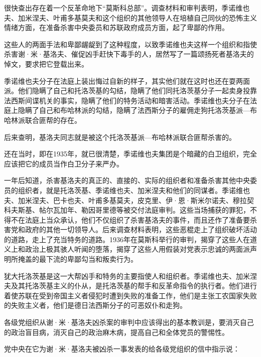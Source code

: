 很快查出存在着一个反革命地下“莫斯科总部”。调查材料和审判表明，季诺维也夫、加米涅夫、叶甫多基莫夫和这个组织的其他领导人在培植自己同伙的恐怖主义情绪方面，在准备杀害中央委员和苏联政府成员方面，起了卑鄙的作用。

这些人的两面手法和卑鄙龌龊到了这种程度，以致季诺维也夫这样一个组织和指使杀害谢·米·基洛夫、催促凶手赶快下毒手的人，居然写了一篇颂扬死者基洛夫的悼文，要求把它登载出来。

季诺维也夫分子在法庭上装出悔过自新的样子，其实他们就在这时也还在耍两面派。他们隐瞒了自己和托洛茨基的勾结，隐瞒了他们同托洛茨基分子一起卖身投靠法西斯间谍机关的事实，隐瞒了他们的特务活动和暗害活动。季诺维也夫分子在法庭上隐瞒了自己和布哈林派的勾结，隐瞒了法西斯分子的雇佣走狗托洛茨基派—布哈林派联合匪帮的存在。

后来查明，基洛夫同志就是被这个托洛茨基派—布哈林派联合匪帮杀害的。

还在当时，即在1935年，就已很清楚，季诺维也夫集团是个暗藏的白卫组织，完全应该把它的成员当作白卫分子来严办。

一年后知道，杀害基洛夫的真正的、直接的、实际的组织者和准备杀害其他中央委员的组织者，就是托洛茨基、季诺维也夫、加米涅夫和他们的同谋者。季诺维也夫、加米涅夫、巴卡也夫、叶甫多基莫夫，皮克里、伊·恩·斯米尔诺夫、穆拉契科夫斯基、帖尔瓦加年、勒因哥里德等被交付法庭审判。这些当场捕获的罪犯，不得不在法庭上当众承认，他们不仅组织了杀害基洛夫的事件，而且还作了准备要杀害党和政府的其他一切领导人。后来调查材料表明，这些恶棍走上了组织破坏活动的道路，走上了充当特务的道路。1936年在莫斯科举行的审判，揭穿了这些人在道义上和政治上极其骇人听闻的堕落，揭穿了这些人用假装对党表示忠诚的两面派声明所掩盖的最下流的卑鄙勾当和叛卖行为。

犹大托洛茨基是这一大帮凶手和特务的主要指使人和组织者。季诺维也夫、加米涅夫及其托洛茨基主义的仆从，是托洛茨基的帮手和反革命指令的执行者。他们进行着使苏联在受到帝国主义者侵犯时遭到失败的准备工作，他们是主张工农国家失败的失败主义者，他们是德日法西斯分子的可恶奴仆和走狗。

各级党组织从谢·米·基洛夫凶杀案的审判中应该得出的基本教训是，要消灭自己的政治盲目病，消灭自己的政治麻木病，提高自己和全体党员的警惕性。

党中央在它为谢·米·基洛夫被凶杀一事发表的给各级党组织的信中指示说：

